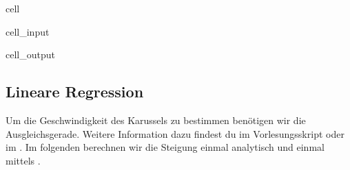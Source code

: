 \documentclass[letterpaper,10pt,english]{jupyterBook}
\begin{document}
\begin{sphinxuseclass}{cell}
\begin{sphinxVerbatimInput}
\begin{sphinxuseclass}{cell_input}
\end{sphinxuseclass}\end{sphinxVerbatimInput}
\begin{sphinxVerbatimOutput}

\begin{sphinxuseclass}{cell_output}
\noindent{}

\end{sphinxuseclass}\end{sphinxVerbatimOutput}

\end{sphinxuseclass}

\subsection{Lineare Regression}
\label{\detokenize{content/T_Fehlerfortpflanzung:lineare-regression}}
\sphinxAtStartPar
Um die Geschwindigkeit des Karussels zu bestimmen benötigen wir die Ausgleichsgerade.
Weitere Information dazu findest du {\hyperref[\detokenize{content/1_Kurvenanpassung::doc}]{}} im Vorlesungsskript oder im {\hyperref[\detokenize{content/T_LinReg::doc}]{}}.
Im folgenden  berechnen wir die Steigung einmal analytisch und einmal mittels .
\end{document}
